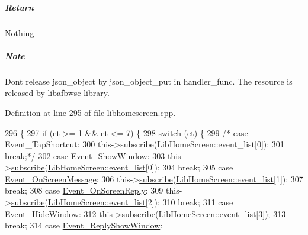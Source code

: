 \subparagraph*{Return}

Nothing

\subparagraph*{Note}

Don\textquotesingle{}t release json\+\_\+object by json\+\_\+object\+\_\+put in handler\+\_\+func. The resource is released by libafbwsc library. 

Definition at line 295 of file libhomescreen.\+cpp.


\begin{DoxyCode}
296 \{
297     \textcolor{keywordflow}{if} (et >= 1 && et <= 7) \{
298         \textcolor{keywordflow}{switch} (et) \{
299 \textcolor{comment}{/*          case Event\_TapShortcut:}
300 \textcolor{comment}{                this->subscribe(LibHomeScreen::event\_list[0]);}
301 \textcolor{comment}{                break;*/}
302             \textcolor{keywordflow}{case} \hyperlink{class_lib_home_screen_a82616c91ac211d2ad08e709b524bf154a3fb3563c64786f1a2ae404df6edffd5c}{Event\_ShowWindow}:
303                 this->\hyperlink{class_lib_home_screen_aa4c189807b75d070f567967f0d690738}{subscribe}(\hyperlink{class_lib_home_screen_a6a6d8a4d33a006a08652e7377a4c29e9}{LibHomeScreen::event\_list}[0]);
304                 \textcolor{keywordflow}{break};
305             \textcolor{keywordflow}{case} \hyperlink{class_lib_home_screen_a82616c91ac211d2ad08e709b524bf154aea56fa32a124a8ddcbea127755280a1d}{Event\_OnScreenMessage}:
306                 this->\hyperlink{class_lib_home_screen_aa4c189807b75d070f567967f0d690738}{subscribe}(\hyperlink{class_lib_home_screen_a6a6d8a4d33a006a08652e7377a4c29e9}{LibHomeScreen::event\_list}[1]);
307                 \textcolor{keywordflow}{break};
308             \textcolor{keywordflow}{case} \hyperlink{class_lib_home_screen_a82616c91ac211d2ad08e709b524bf154acae91db4efc2394fd701f581d277a3fd}{Event\_OnScreenReply}:
309                 this->\hyperlink{class_lib_home_screen_aa4c189807b75d070f567967f0d690738}{subscribe}(\hyperlink{class_lib_home_screen_a6a6d8a4d33a006a08652e7377a4c29e9}{LibHomeScreen::event\_list}[2]);
310                 \textcolor{keywordflow}{break};
311             \textcolor{keywordflow}{case} \hyperlink{class_lib_home_screen_a82616c91ac211d2ad08e709b524bf154aef8bb1086ddbc0a125d77af9da3146a0}{Event\_HideWindow}:
312                 this->\hyperlink{class_lib_home_screen_aa4c189807b75d070f567967f0d690738}{subscribe}(\hyperlink{class_lib_home_screen_a6a6d8a4d33a006a08652e7377a4c29e9}{LibHomeScreen::event\_list}[3]);
313                 \textcolor{keywordflow}{break};
314             \textcolor{keywordflow}{case} \hyperlink{class_lib_home_screen_a82616c91ac211d2ad08e709b524bf154aaacb8babce7fac884ab4bf7605da0d9f}{Event\_ReplyShowWindow}:

\end{DoxyCode}
